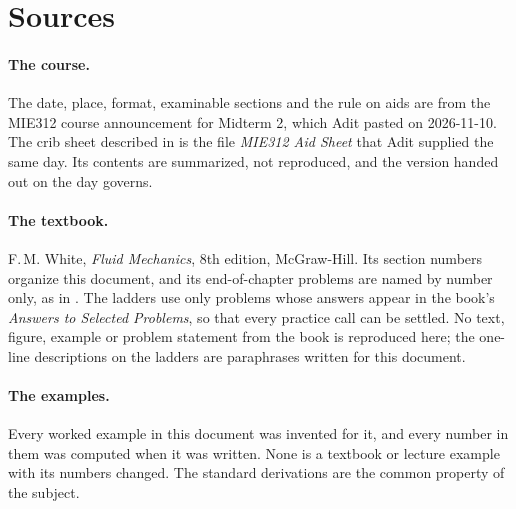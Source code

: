 \section{Sources}

\begin{sloppypar}
\paragraph{The course.} The date, place, format, examinable sections and the rule on aids are from the MIE312 course announcement for Midterm 2, which Adit pasted on 2026-11-10. The crib sheet described in  is the file \emph{MIE312 Aid Sheet} that Adit supplied the same day. Its contents are summarized, not reproduced, and the version handed out on the day governs.

\paragraph{The textbook.} F.\,M. White, \emph{Fluid Mechanics}, 8th edition, McGraw-Hill. Its section numbers organize this document, and its end-of-chapter problems are named by number only, as in . The ladders use only problems whose answers appear in the book's \emph{Answers to Selected Problems}, so that every practice call can be settled. No text, figure, example or problem statement from the book is reproduced here; the one-line descriptions on the ladders are paraphrases written for this document.

\paragraph{The examples.} Every worked example in this document was invented for it, and every number in them was computed when it was written. None is a textbook or lecture example with its numbers changed. The standard derivations are the common property of the subject.
\end{sloppypar}
